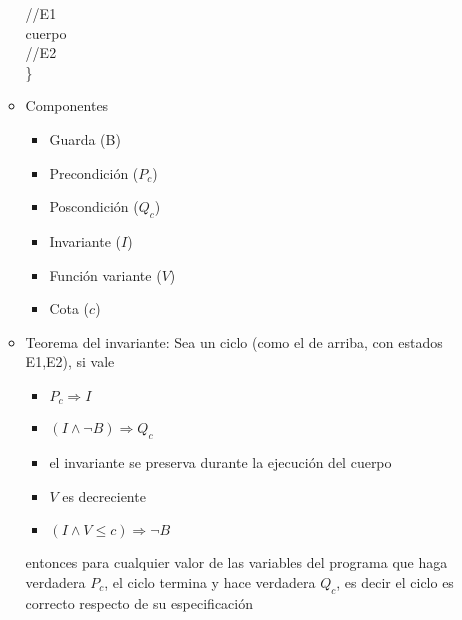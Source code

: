 \documentclass[a4paper,10pt]{article}
\begin{document}
\begin{itemize}
\begin{itemize}
	    	//E1 \\
	    	cuerpo \\
	    	//E2 \\
	    \}
	    \item Componentes
	    \begin{itemize}
	    	\item Guarda (B)
		\item Precondición ($P_c$)
		\item Poscondición ($Q_c$)
		\item Invariante ($I$)
		\item Función variante ($V$)
		\item Cota ($c$)
	    \end{itemize}
	    \item Teorema del invariante: Sea un ciclo (como el de arriba, con estados E1,E2), si vale
	    \begin{itemize}
		\item $P_c \Rightarrow I$
		\item $(I \wedge \neg B) \Rightarrow Q_c$
		\item el invariante se preserva durante la ejecución del cuerpo
		\item $V$ es decreciente
		\item $(I \wedge V \leq c) \Rightarrow \neg B$
	    \end{itemize}
	    \subitem entonces para cualquier valor de las variables del programa que haga verdadera $P_c$, el ciclo termina y hace verdadera $Q_c$, es decir el ciclo es correcto respecto de su especificación
	\end{itemize}
    \end{itemize}
\end{document}
